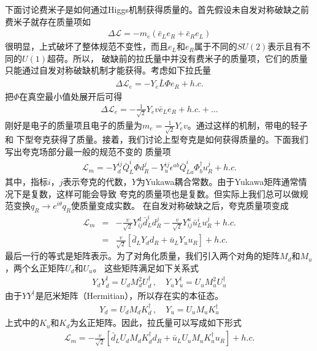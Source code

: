 下面讨论费米子是如何通过Higgs机制获得质量的。首先假设未自发对称破缺之前费米子就存在质量项如
\begin{eqnarray}
\Delta\mathscr{L} = - m_e (\bar{e}_L e_R + \bar{e}_R e_L)
\end{eqnarray}
很明显，上式破坏了整体规范不变性，而且$e_L$和$e_R$属于不同的$SU(2)$表示且有不同的$U(1)$超荷。所以，
破缺前的拉氏量中并没有费米子的质量项，它们的质量只能通过自发对称破缺机制才能获得。考虑如下拉氏量
\begin{eqnarray}
\Delta\mathscr{L}_e = -Y_e \bar{L} \Phi e_R + h.c.
\end{eqnarray}
把$\Phi$在真空最小值处展开后可得
\begin{eqnarray}
\Delta\mathscr{L}_e = -\frac{1}{\sqrt 2} Y_e v \bar{e}_L e_R + h.c. + \ldots
\end{eqnarray}
刚好是电子的质量项且电子的质量为$m_e = \frac{1}{\sqrt 2} Y_e v$。通过这样的机制，带电的轻子和
下型夸克获得了质量。接着，我们讨论上型夸克是如何获得质量的。下面我们写出夸克场部分最一般的规范不变的
质量项
\begin{eqnarray}
\mathscr{L}_m = - Y^{ij}_d \bar{Q}^i_L \Phi d^j_R - Y^{ij}_u \epsilon^{ab}\bar{Q}^i_{La}
\Phi^{\dagger}_b u^j_R + h.c.
\end{eqnarray}
其中，指标$i$，$j$表示夸克的代数，$Y$为Yukawa耦合常数。由于Yukawa矩阵通常情况下是复数，这样可能会导致
夸克的质量项也是复数。但实际上我们总可以做规范变换$q_R \to e^{i\theta} q_R$使质量变成实数。
在自发对称破缺之后，夸克质量项变成
\begin{eqnarray}
\mathscr{L}_m &=& -\frac{v}{\sqrt 2}Y^d_{ij}\bar{d}^i_L d^j_R - \frac{v}{\sqrt 2}Y^u_{ij}\bar{u}^i_L u^j_R
+ h.c.
\nonumber \\
&=& \frac{v}{\sqrt 2}[\bar{d}_L Y_d d_R + \bar{u}_L Y_u u_R] + h.c.
\end{eqnarray}
最后一行的等式是矩阵表示。为了对角化质量，我们引入两个对角的矩阵$M_d$和$M_u$，两个幺正矩阵$U_d$和$U_u$。
这些矩阵满足如下关系式
\begin{eqnarray}
Y_d Y^{\dagger}_d = U_d M^2_d U^{\dagger}_d\, , \quad Y_u Y^{\dagger}_u = U_u M^2_u U^{\dagger}_u
\end{eqnarray}
由于$YY^{\dagger}$是厄米矩阵（Hermitian），所以存在实的本征态。
\begin{eqnarray}
Y_d = U_d M_d K^{\dagger}_d \, , \quad Y_u = U_u M_u K^{\dagger}_u
\end{eqnarray}
上式中的$K_u$和$K_d$为幺正矩阵。因此，拉氏量可以写成如下形式
\begin{eqnarray}
\mathscr{L}_m = -\frac{v}{\sqrt 2} [\bar{d}_L U_dM_d K^{\dagger}_d d_R + 
\bar{u}_L U_u M_u K^{\dagger}_u u_R] + h.c.  
\end{eqnarray}
